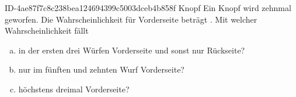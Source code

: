 \begin{exercise}
      {ID-4ae87f7c8c238bea124694399c5003dceb4b858f}
      {Knopf}
  \ifproblem\problem
    Ein Knopf wird zehnmal geworfen. Die Wahrscheinlichkeit für \glqq Vorderseite\grqq{}
    beträgt . Mit welcher Wahrscheinlichkeit fällt
    \begin{enumerate}[a)]
      \item in der ersten drei Würfen \glqq Vorderseite\grqq{} und sonst nur
            \glqq Rückseite\grqq?
      \item nur im fünften und zehnten Wurf \glqq Vorderseite\grqq?
      \item höchstens dreimal \glqq Vorderseite\grqq?
    \end{enumerate}
  \fi
\end{exercise}
